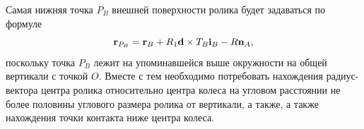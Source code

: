 Самая нижняя точка $P_B$ внешней 
поверхности ролика будет задаваться по формуле
\begin{equation}
{\bf r}_{P_B}={\bf r}_B+R_1{\bf d}\times T_B{\bf i}_B-R{\bf n}_A,
\label{3_2_0}
\end{equation}
поскольку точка $P_B$ лежит на упоминавшейся выше окружности на общей вертикали 
с точкой $O$.
Вместе с тем необходимо потребовать нахождения радиус-вектора центра ролика
относительно центра колеса на угловом расстоянии не более половины углового размера ролика от вертикали,
а также, а также нахождения точки контакта ниже центра колеса.



